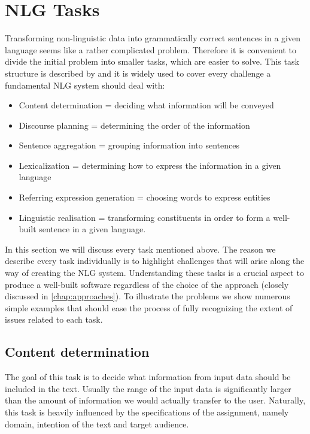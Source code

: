 \chapter{NLG Tasks}\label{chap:tasks}
Transforming non-linguistic data into grammatically correct sentences in a given language seems like a rather complicated problem. Therefore it is convenient to divide the initial problem into smaller tasks, which are easier to solve. This task structure is described by \citet{reiter1997building} and it is widely used to cover every challenge a fundamental NLG system should deal with:
\begin{itemize}
	\item Content determination 
	= deciding what information will be conveyed
	\item Discourse planning = determining the order of the information
	\item Sentence aggregation = grouping information into sentences
	\item Lexicalization = determining how to express the information in a given language
	\item Referring expression generation = choosing words to express entities
	\item Linguistic realisation = transforming constituents in order to form a well-built sentence in a given language.
\end{itemize}

In this section we will discuss every task mentioned above. The reason we describe every task individually is to highlight challenges that will arise along the way of creating the NLG system. Understanding these tasks is a crucial aspect to produce a well-built software regardless of the choice of the approach (closely discussed in \autoref{chap:approaches}). To illustrate the problems we show numerous simple examples that should ease the process of fully recognizing the extent of issues related to each task.

\section{Content determination}
The goal of this task is to decide what information from input data should be included in the text. Usually the range of the input data is significantly larger than the amount of information we would actually transfer to the user. Naturally, this task is heavily influenced by the specifications of the assignment, namely domain, intention of the text and target audience.

